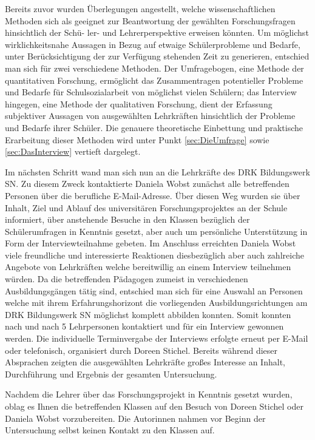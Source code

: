 Bereits zuvor wurden Überlegungen angestellt, welche wissenschaftlichen Methoden sich als geeignet zur Beantwortung der gewählten Forschungsfragen hinsichtlich der Schü- ler- und  Lehrerperspektive erweisen könnten. Um möglichst wirklichkeitsnahe Aussagen in Bezug auf etwaige Schülerprobleme und Bedarfe, unter Berücksichtigung der zur Verfügung stehenden Zeit zu generieren, entschied man sich für zwei verschiedene Methoden. Der Umfragebogen, eine Methode der quantitativen Forschung, ermöglicht das Zusammentragen potentieller Probleme und Bedarfe für Schulsozialarbeit von möglichst vielen Schülern; das Interview hingegen, eine Methode der qualitativen Forschung, dient der Erfassung subjektiver Aussagen von ausgewählten Lehrkräften hinsichtlich der Probleme und Bedarfe ihrer Schüler. Die genauere theoretische Einbettung und praktische Erarbeitung dieser Methoden wird unter Punkt \ref{sec:DieUmfrage} sowie \ref{sec:DasInterview} vertieft dargelegt.

Im nächsten Schritt wand man sich nun an die Lehrkräfte des DRK Bildungswerk SN. Zu diesem Zweck kontaktierte Daniela Wobst zunächst alle betreffenden Personen über die berufliche E-Mail-Adresse. Über diesen Weg wurden sie über Inhalt, Ziel und Ablauf des universitären Forschungsprojektes an der Schule informiert, über anstehende Besuche in den Klassen bezüglich der Schülerumfragen in Kenntnis gesetzt, aber auch um persönliche Unterstützung in Form der Interviewteilnahme gebeten. Im Anschluss erreichten Daniela Wobst viele freundliche und interessierte Reaktionen diesbezüglich aber auch zahlreiche Angebote von Lehrkräften welche bereitwillig an einem Interview teilnehmen würden. Da die betreffenden Pädagogen zumeist in verschiedenen Ausbildungsgängen tätig sind, entschied man sich für eine Auswahl an Personen welche mit ihrem Erfahrungshorizont die vorliegenden Ausbildungsrichtungen am DRK Bildungswerk SN möglichst komplett abbilden konnten. Somit konnten nach und nach 5 Lehrpersonen kontaktiert und für ein Interview gewonnen werden. Die individuelle Terminvergabe der Interviews erfolgte erneut per E-Mail oder telefonisch, organisiert durch Doreen Stichel. Bereits während dieser Absprachen zeigten die ausgewählten Lehrkräfte großes Interesse an Inhalt, Durchführung und Ergebnis der gesamten Untersuchung.

Nachdem die Lehrer über das Forschungsprojekt in Kenntnis gesetzt wurden, oblag es Ihnen die betreffenden Klassen auf den Besuch von Doreen Stichel oder Daniela Wobst vorzubereiten. Die Autorinnen nahmen vor Beginn der Untersuchung selbst keinen Kontakt zu den Klassen auf.

